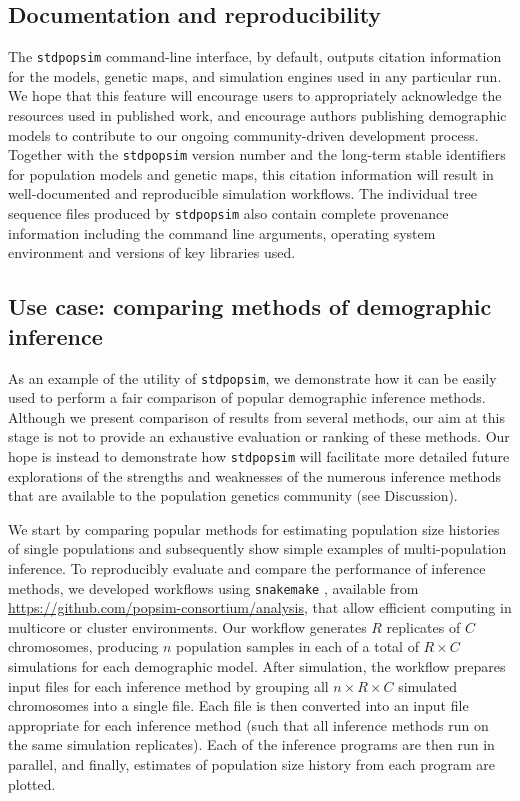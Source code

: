\documentclass[12pt,halfline,a4paper]{ouparticle}
\newcommand{\stdpopsim}{\texttt{stdpopsim}\xspace}
\begin{document}
\subsection*{Documentation and reproducibility}

The \stdpopsim command-line interface, by default, outputs citation information
for the models, genetic maps, and simulation engines used in any particular run.
We hope that this feature will encourage users to appropriately acknowledge the
resources used in published work, and encourage authors
publishing demographic models to contribute to our ongoing community-driven development process.
Together with the \stdpopsim version number and the long-term stable identifiers
for population models and genetic maps,
this citation information will result in well-documented and reproducible
simulation workflows. The individual tree sequence files produced by
\stdpopsim also contain complete provenance information including the command
line arguments, operating system environment and versions of key libraries
used.

\subsection*{Use case: comparing methods of demographic inference}

As an example of the utility of \stdpopsim, we demonstrate how it can be easily used
to perform a fair comparison of popular demographic inference methods.
Although we present comparison of results from several
methods, our aim at this stage is not to provide an exhaustive
evaluation or ranking of these methods. Our hope is instead to demonstrate how \stdpopsim
will facilitate more detailed future explorations of the strengths and weaknesses of the numerous
inference methods that are available to the population genetics community
(see Discussion).

We start by comparing popular methods for estimating
population size histories of single populations and subsequently
show simple examples of multi-population inference.
To reproducibly evaluate and compare the performance of inference methods, we developed
workflows using \texttt{snakemake} \citep{koster2012snakemake},
available from \url{https://github.com/popsim-consortium/analysis},
that allow efficient computing in multicore or cluster environments.
Our workflow generates $R$ replicates of $C$ chromosomes,
producing $n$ population samples in each of a total of $R \times C$ simulations for each demographic model.
After simulation,
the workflow prepares input files for each inference method
by grouping all $n \times R \times C$ simulated chromosomes
into a single file.
Each file is then converted into an input file appropriate for each inference method
(such that all inference methods run on the same simulation replicates).
Each of the inference programs are then run in parallel, and finally,
estimates of population size history from each program are plotted.
\end{document}
